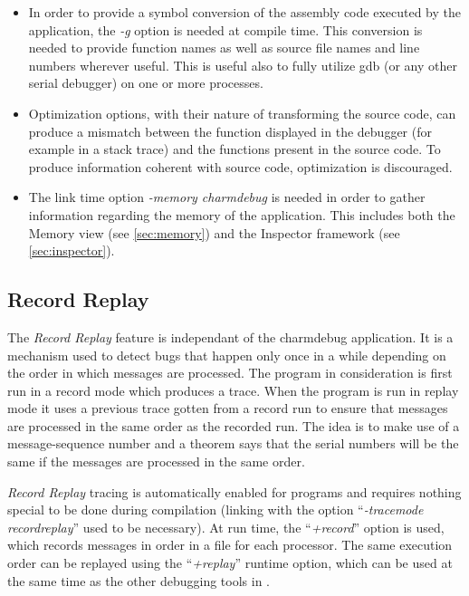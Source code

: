 \documentclass[10pt]{article}
\begin{document}
\begin{itemize}

\item In order to provide a symbol conversion of the assembly code executed
by the application, the \textit{-g} option is needed at compile time. This
conversion is needed to provide function names as well as source file names
and line numbers wherever useful. This is useful also to fully utilize gdb
(or any other serial debugger) on one or more processes.

\item Optimization options, with their nature of transforming the source code,
can produce a mismatch between the function displayed in the debugger (for
example in a stack trace) and the functions present in the source code. To
produce information coherent with source code, optimization is discouraged.

\item The link time option \textit{-memory charmdebug} is needed in
order to gather information regarding the memory of the application. This
includes both the Memory view (see \ref{sec:memory}) and the Inspector
framework (see \ref{sec:inspector}).

\end{itemize}

\subsection{Record Replay}

The \textit{Record Replay} feature is independant of the charmdebug
application.  It is a mechanism used to detect bugs that happen only
once in a while depending on the order in which messages are
processed. The program in consideration is first run in a record mode
which produces a trace. When the program is run in replay mode it uses
a previous trace gotten from a record run to ensure that messages are
processed in the same order as the recorded run. The idea is to make
use of a message-sequence number and a theorem says that the serial
numbers will be the same if the messages are processed in the same
order. \cite{rashmithesis}

\textit{Record Replay} tracing is automatically enabled for \charmpp{}
programs and requires nothing special to be done during compilation
(linking with the option ``\textit{-tracemode recordreplay}'' used to
be necessary).  At run time, the ``\textit{+record}'' option is used,
which records messages in order in a file for each processor.  The
same execution order can be replayed using the ``\textit{+replay}''
runtime option, which can be used at the same time as the other
debugging tools in \charmpp{}.
\end{document}
